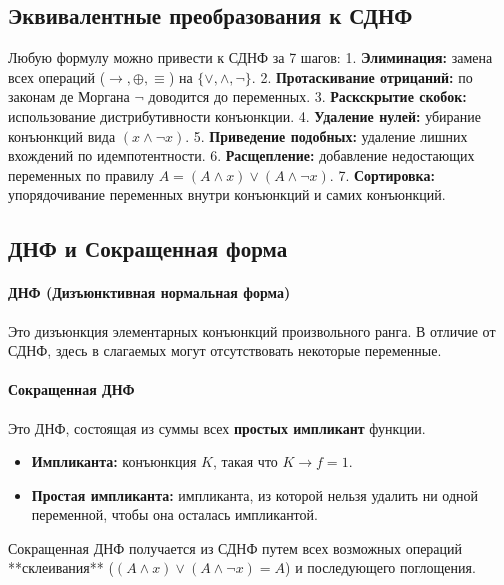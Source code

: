 \subsection*{Эквивалентные преобразования к СДНФ}
Любую формулу можно привести к СДНФ за 7 шагов:
1. \textbf{Элиминация:} замена всех операций ($\to, \oplus, \equiv$) на $\{\lor, \land, \neg\}$.
2. \textbf{Протаскивание отрицаний:} по законам де Моргана $\neg$ доводится до переменных.
3. \textbf{Раскскрытие скобок:} использование дистрибутивности конъюнкции.
4. \textbf{Удаление нулей:} убирание конъюнкций вида $(x \land \neg x)$.
5. \textbf{Приведение подобных:} удаление лишних вхождений по идемпотентности.
6. \textbf{Расщепление:} добавление недостающих переменных по правилу $A = (A \land x) \lor (A \land \neg x)$.
7. \textbf{Сортировка:} упорядочивание переменных внутри конъюнкций и самих конъюнкций.

\subsection*{ДНФ и Сокращенная форма}

\paragraph{ДНФ (Дизъюнктивная нормальная форма)}
Это дизъюнкция элементарных конъюнкций произвольного ранга. В отличие от СДНФ, здесь в слагаемых могут отсутствовать некоторые переменные.

\paragraph{Сокращенная ДНФ}
Это ДНФ, состоящая из суммы всех \textbf{простых импликант} функции.
\begin{itemize}
    \item \textbf{Импликанта:} конъюнкция $K$, такая что $K \to f = 1$.
    \item \textbf{Простая импликанта:} импликанта, из которой нельзя удалить ни одной переменной, чтобы она осталась импликантой.
\end{itemize}
Сокращенная ДНФ получается из СДНФ путем всех возможных операций **склеивания** ($(A \land x) \lor (A \land \neg x) = A$) и последующего поглощения.
